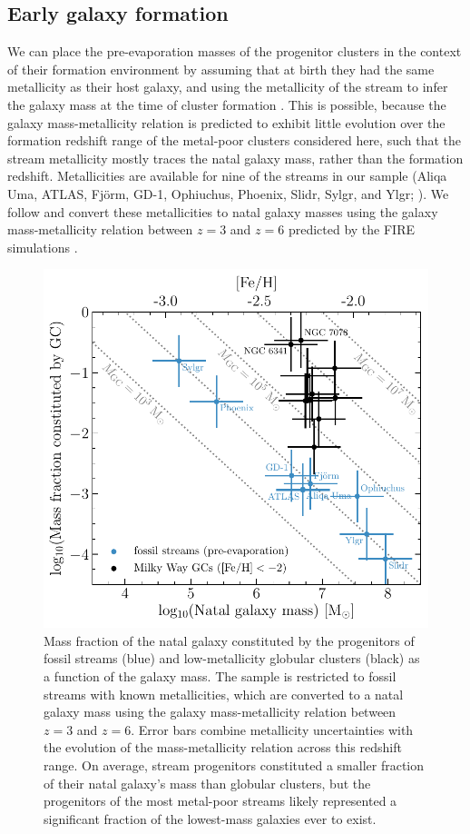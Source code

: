 \documentclass[twocolumn]{aastex63}
\begin{document}
\subsection{Early galaxy formation}
\label{sec:discuss_galform}
We can place the pre-evaporation masses of the progenitor clusters in the context of their formation environment by assuming that at birth they had the same metallicity as their host galaxy, and using the metallicity of the stream to infer the galaxy mass at the time of cluster formation \citep{kruijssen20b}. This is possible, because the galaxy mass-metallicity relation is predicted to exhibit little evolution over the formation redshift range of the metal-poor clusters considered here, such that the stream metallicity mostly traces the natal galaxy mass, rather than the formation redshift. Metallicities are available for nine of the streams in our sample (Aliqa Uma, ATLAS, Fj\"orm, GD-1, Ophiuchus, Phoenix, Slidr, Sylgr, and Ylgr; \citealt{ibata:2019,li:2020,wan20}). We follow \citet{kruijssen19c} and convert these metallicities to natal galaxy masses using the galaxy mass-metallicity relation between $z=3$ and $z=6$ predicted by the FIRE simulations \citep{ma16}.

\begin{figure}
\includegraphics[width=\hsize]{mhost_fraction.pdf}
\caption{
\label{fig:mhost}
Mass fraction of the natal galaxy constituted by the progenitors of fossil streams (blue) and low-metallicity globular clusters (black) as a function of the galaxy mass.
The sample is restricted to fossil streams with known metallicities, which are converted to a natal galaxy mass using the galaxy mass-metallicity relation between $z=3$ and $z=6$.
Error bars combine metallicity uncertainties with the evolution of the mass-metallicity relation across this redshift range.
On average, stream progenitors constituted a smaller fraction of their natal galaxy's mass than globular clusters, but the progenitors of the most metal-poor streams likely represented a significant fraction of the lowest-mass galaxies ever to exist.
}
\end{figure}
\end{document}
